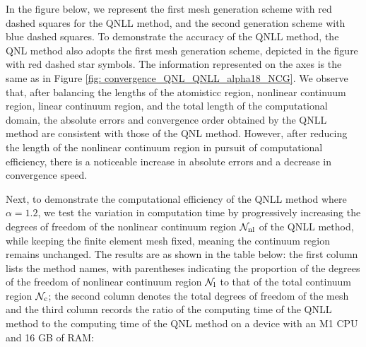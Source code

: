 In the figure below, we represent the first mesh generation scheme with red dashed squares for the QNLL method, and the second generation scheme with blue dashed squares. To demonstrate the accuracy of the QNLL method, the QNL method also adopts the first mesh generation scheme, depicted in the figure with red dashed star symbols. The information represented on the axes is the same as in Figure \ref{fig: convergence_QNL_QNLL_alpha18_NCG}. We observe that, after balancing the lengths of the atomisticc region, nonlinear continuum region, linear continuum region, and the total length of the computational domain, the absolute errors and convergence order obtained by the QNLL method are consistent with those of the QNL method. However, after reducing the length of the nonlinear continuum region in pursuit of computational efficiency, there is a noticeable increase in absolute errors and a decrease in convergence speed.

Next, to demonstrate the computational efficiency of the QNLL method where $\alpha = 1.2$, we test the variation in computation time by progressively increasing the degrees of freedom of the nonlinear continuum region $\mathcal{N}_{{\rm nl}}$ of the QNLL method, while keeping the finite element mesh fixed, meaning the continuum region remains unchanged. The results are as shown in the table below: the first column lists the method names, with parentheses indicating the proportion of the degrees of the freedom of nonlinear continuum region $\mathcal{N}_{{\rm l}}$ to that of the total continuum region $\mathcal{N}_{{\rm c}}$; the second column denotes the total degrees of freedom of the mesh and the third column records the ratio of the computing time of the QNLL method to the computing time of the QNL method on a device with an M1 CPU and 16 GB of RAM:

